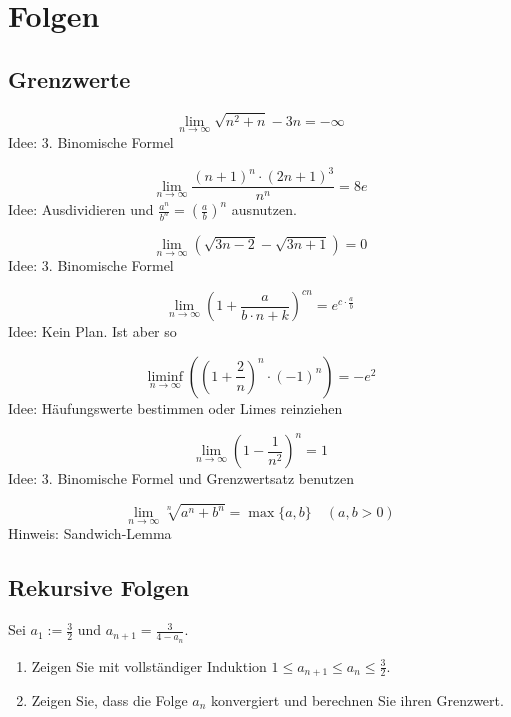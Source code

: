 \section{Folgen}
\subsection{Grenzwerte}
\begin{displaymath}
  \lim_{n \to \infty} {\sqrt{n^2 + n} - 3n} = - \infty
\end{displaymath}
Idee: 3. Binomische Formel

\begin{displaymath}
  \lim_{n \to \infty} \frac{(n+1)^n \cdot (2n+1)^3}{n^n} = 8e
\end{displaymath}
Idee: Ausdividieren und $\frac{a^n}{b^n} = \left( \frac{a}{b}\right) ^n$ ausnutzen.

\begin{displaymath}
  \lim_{n \to \infty} (\sqrt{3n-2} - \sqrt{3n+1}) = 0
\end{displaymath}
Idee: 3. Binomische Formel

\begin{displaymath}
  \lim_{n \to \infty} \left(1 + \frac{a}{b \cdot n + k}\right)^{cn} = e^{c \cdot \frac{a}{b}}
\end{displaymath}
Idee: Kein Plan. Ist aber so

\begin{displaymath}
  \liminf_{n \to \infty} \left(\left(1 + \frac{2}{n}\right)^n \cdot (-1)^n \right) = -e^2
\end{displaymath}
Idee: Häufungswerte bestimmen oder Limes reinziehen

\begin{displaymath}
  \lim_{n \to \infty} \left(1 - \frac{1}{n^2}\right)^n = 1
\end{displaymath}
Idee: 3. Binomische Formel und Grenzwertsatz benutzen

\begin{displaymath}
  \lim_{n \to \infty} \sqrt[n]{a^n + b^n} = \max\{a, b\} \quad (a,b > 0)
\end{displaymath}
Hinweis: Sandwich-Lemma

\subsection{Rekursive Folgen}
Sei $a_1 := \frac{3}{2}$ und $a_{n+1} = \frac{3}{4-a_n}$.
\begin{enumerate}
    \item Zeigen Sie mit vollständiger Induktion $1 \leq a_{n+1} \leq a_n \leq \frac{3}{2}$.
    \item Zeigen Sie, dass die Folge $a_n$ konvergiert und berechnen Sie ihren Grenzwert.
\end{enumerate}

